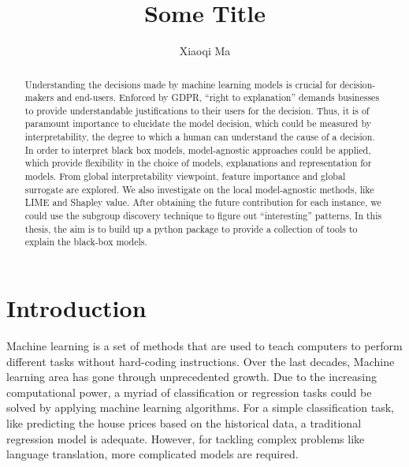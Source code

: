 \documentclass[runningheads]{llncs}
\begin{document}
	
	\title{Some Title}
	\author{Xiaoqi Ma}
	\maketitle  
	
	\begin{abstract}
		
		Understanding the decisions made by machine learning models is crucial for decision-makers and end-users. Enforced by GDPR, “right to explanation” demands businesses to provide understandable justifications to their users for the decision. Thus, it is of paramount importance to elucidate the model decision, which could be measured by interpretability, the degree to which a human can understand the cause of a decision. In order to interpret black box models, model-agnostic approaches could be applied, which provide flexibility in the choice of models, explanations and representation for models. From global interpretability viewpoint, feature importance and global surrogate are explored. We also investigate on the local model-agnostic methods, like LIME and Shapley value. After obtaining the future contribution for each instance, we could use the subgroup discovery technique to figure out “interesting” patterns. In this thesis, the aim is to build up a python package to provide a collection of tools to explain the black-box models. 
		
	\end{abstract}
	
	\section{Introduction}
	
	Machine learning is a set of methods that are used to teach computers to perform different tasks without hard-coding instructions. Over the last decades, Machine learning area has gone through unprecedented growth. Due to the increasing computational power, a myriad of classification or regression tasks could be solved by applying machine learning algorithms. For a simple classification task, like predicting the house prices based on the historical data, a traditional regression model is adequate. However, for tackling complex problems like language translation, more complicated models are required. 
	
\end{document}
